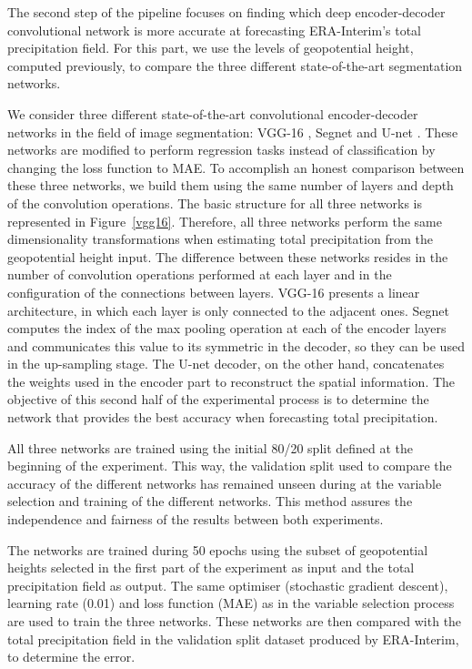 \documentclass[twocol]{ametsoc}
\begin{document}
The second step of the pipeline focuses on finding which deep encoder-decoder convolutional network is more accurate at forecasting ERA-Interim's total precipitation field. For this part, we use the levels of geopotential height, computed previously, to compare the three different state-of-the-art segmentation networks.

We consider three different state-of-the-art convolutional encoder-decoder networks in the field of image segmentation: VGG-16 \citep{long2015fully}, Segnet \citep{badrinarayanan2017segnet} and U-net \citep{ronneberger2015u}. These networks are modified to perform regression tasks instead of classification by changing the loss function to MAE. To accomplish an honest comparison between these three networks, we build them using the same number of layers and depth of the convolution operations. The basic structure for all three networks is represented in Figure~\ref{vgg16}. Therefore, all three networks perform the same dimensionality transformations when estimating total precipitation from the geopotential height input. The difference between these networks resides in the number of convolution operations performed at each layer and in the configuration of the connections between layers. VGG-16 presents a linear architecture, in which each layer is only connected to the adjacent ones. Segnet computes the index of the max pooling operation at each of the encoder layers and communicates this value to its symmetric in the decoder, so they can be used in the up-sampling stage. The U-net decoder, on the other hand, concatenates the weights used in the encoder part to reconstruct the spatial information. The objective of this second half of the experimental process is to determine the network that provides the best accuracy when forecasting total precipitation.

All three networks are trained using the initial 80/20 split defined at the beginning of the experiment. This way, the validation split used to compare the accuracy of the different networks has remained unseen during at the variable selection and training of the different networks. This method assures the independence and fairness of the results between both experiments. 

The networks are trained during 50 epochs using the subset of geopotential heights selected in the first part of the experiment as input and the total precipitation field as output. The same optimiser (stochastic gradient descent), learning rate (0.01) and loss function (MAE) as in the variable selection process are used to train the three networks. These networks are then compared with the total precipitation field in the validation split dataset produced by ERA-Interim, to determine the error.
\end{document}
